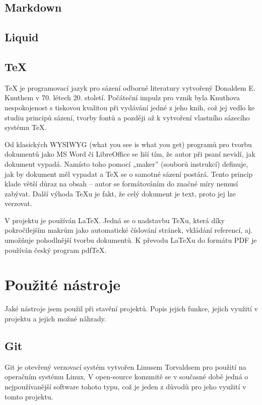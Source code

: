 \documentclass[a4paper, 12pt]{article}
\begin{document}
  \subsection{Markdown} \label{sec:Markdown}

  \subsection{Liquid}

  \subsection{\TeX} \label{sec:TeX}
  \TeX{} je programovací jazyk pro sázení odborné literatury vytvořený Donaldem E. Knuthem v 70. létech 20. století. Počáteční impulz pro vznik byla Knuthova nespokojenost s tiskovou kvalitou při vydávání jedné z jeho knih, což jej vedlo ke studiu principů sázení, tvorby fontů a později až k vytvoření vlastního sázecího systému \TeX\cite{tex-history}.

  Od klasických WYSIWYG (what you see is what you get) programů pro tvorbu dokumentů jako MS Word či LibreOffice se liší tím, že autor při psaní nevidí, jak dokument vypadá. Namísto toho pomocí „maker” (souborů instrukcí) definuje, jak by dokument měl vypadat a \TeX{} se o samotné sázení postárá. Tento princip klade větší důraz na obsah -- autor se formátováním do značné míry nemusí zabývat. Další výhoda \TeX u je fakt, že celý dokument je text, proto jej lze verzovat.

  V projektu je používán \LaTeX. Jedná se o nadstavbu \TeX u, která díky pokročilejším makrům jako automatické číslování stránek, vkládání referencí, aj. umožňuje pohodlnější tvorbu dokumentů\cite{getting-started-with-latex}. K převodu \LaTeX u do formátu PDF je používán český program pdf\TeX{}\cite{pdftex}.


  \section{Použité nástroje} \label{sec:Použité nástroje}
  Jaké nástroje jsem použil při stavění projektů.
  Popis jejich funkce, jejich využití v projektu a jejich možné náhrady.

  \subsection{Git} \label{sec:Git}
  Git je otevřený\cite{git-source} verzovací systém vytvořen Linusem Torvaldsem pro použití na operačním systému Linux. V open-source komunitě se v současné době jedná o nejpoužívanější software tohoto typu\cite{version-control-usage-statistics}, což je jeden z důvodů pro jeho využití v tomto projektu.
\end{document}
